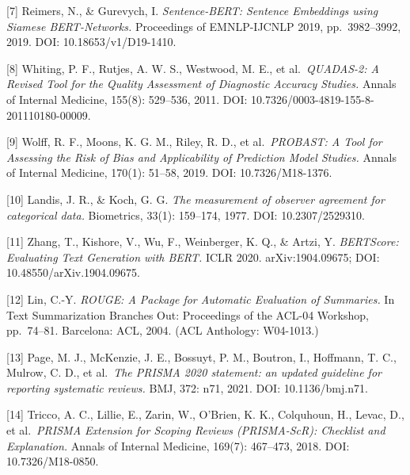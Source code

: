 \documentclass[11pt]{article}
\begin{document}
{[}7{]} Reimers, N., \& Gurevych, I. \emph{Sentence-BERT: Sentence
Embeddings using Siamese BERT-Networks.} Proceedings of EMNLP-IJCNLP
2019, pp.~3982--3992, 2019. DOI: 10.18653/v1/D19-1410.

{[}8{]} Whiting, P. F., Rutjes, A. W. S., Westwood, M. E., et
al.~\emph{QUADAS-2: A Revised Tool for the Quality Assessment of
Diagnostic Accuracy Studies.} Annals of Internal Medicine, 155(8):
529--536, 2011. DOI: 10.7326/0003-4819-155-8-201110180-00009.

{[}9{]} Wolff, R. F., Moons, K. G. M., Riley, R. D., et
al.~\emph{PROBAST: A Tool for Assessing the Risk of Bias and
Applicability of Prediction Model Studies.} Annals of Internal Medicine,
170(1): 51--58, 2019. DOI: 10.7326/M18-1376.

{[}10{]} Landis, J. R., \& Koch, G. G. \emph{The measurement of observer
agreement for categorical data.} Biometrics, 33(1): 159--174, 1977. DOI:
10.2307/2529310.

{[}11{]} Zhang, T., Kishore, V., Wu, F., Weinberger, K. Q., \& Artzi, Y.
\emph{BERTScore: Evaluating Text Generation with BERT.} ICLR 2020.
arXiv:1904.09675; DOI: 10.48550/arXiv.1904.09675.

{[}12{]} Lin, C.-Y. \emph{ROUGE: A Package for Automatic Evaluation of
Summaries.} In Text Summarization Branches Out: Proceedings of the
ACL-04 Workshop, pp.~74--81. Barcelona: ACL, 2004. (ACL Anthology:
W04-1013.)

{[}13{]} Page, M. J., McKenzie, J. E., Bossuyt, P. M., Boutron, I.,
Hoffmann, T. C., Mulrow, C. D., et al.~\emph{The PRISMA 2020 statement:
an updated guideline for reporting systematic reviews.} BMJ, 372: n71,
2021. DOI: 10.1136/bmj.n71.

{[}14{]} Tricco, A. C., Lillie, E., Zarin, W., O'Brien, K. K.,
Colquhoun, H., Levac, D., et al.~\emph{PRISMA Extension for Scoping
Reviews (PRISMA-ScR): Checklist and Explanation.} Annals of Internal
Medicine, 169(7): 467--473, 2018. DOI: 10.7326/M18-0850.
\end{document}
